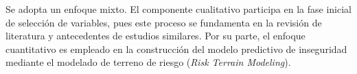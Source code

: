 
Se adopta un enfoque mixto. El componente cualitativo participa en la fase inicial de selección de variables, pues este proceso se fundamenta en la revisión de literatura y antecedentes de estudios similares. Por su parte, el enfoque cuantitativo es empleado en la construcción del modelo predictivo de inseguridad mediante el modelado de terreno de riesgo (\textit{Risk Terrain Modeling}).
